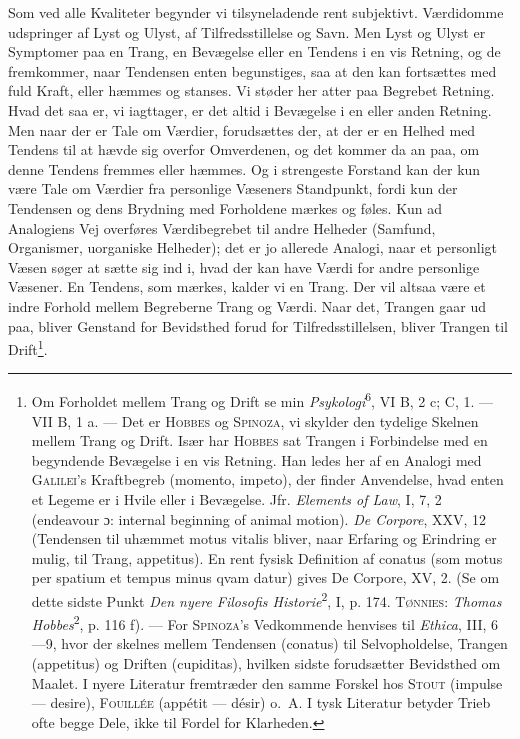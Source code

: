 \documentclass[12pt]{article}
\begin{document}
Som ved alle Kvaliteter begynder vi tilsyneladende rent subjektivt. Værdidomme
udspringer af Lyst og Ulyst, af Tilfredsstillelse og Savn. Men Lyst og Ulyst er
Symptomer paa en Trang, en Bevægelse eller en Tendens i en vis Retning, og de
fremkommer, naar Tendensen enten begunstiges, saa at den kan fortsættes med fuld
Kraft, eller hæmmes og stanses. Vi støder her atter paa Begrebet Retning. Hvad
det saa er, vi iagttager, er det altid i Bevægelse i en eller anden Retning. Men
naar der er Tale om Værdier, forudsættes der, at der er en Helhed med Tendens
til at hævde sig overfor Omverdenen, og det kommer da an paa, om denne Tendens
fremmes eller hæmmes. Og i strengeste Forstand kan der kun være Tale om Værdier
fra personlige Væseners Standpunkt, fordi kun der Tendensen og dens Brydning med
Forholdene mærkes og føles. Kun ad Analogiens Vej overføres Værdibegrebet til
andre Helheder (Samfund, Organismer, uorganiske Helheder); det er jo allerede
Analogi, naar et personligt Væsen søger at sætte sig ind i, hvad der kan have
Værdi for andre personlige Væsener. En Tendens, som mærkes, kalder vi en Trang.
Der vil altsaa være et indre Forhold mellem Begreberne Trang og Værdi. Naar det,
Trangen gaar ud paa, bliver Genstand for Bevidsthed forud for
Tilfredsstillelsen, bliver Trangen til Drift\footnote{Om Forholdet mellem Trang
og Drift se min \textit{Psykologi}\textsuperscript{6}, VI B, 2 c; C, 1. --- VII
B, 1 a. --- Det er \textsc{Hobbes} og \textsc{Spinoza}, vi skylder den tydelige
Skelnen mellem Trang og Drift. Især har \textsc{Hobbes} sat Trangen i
Forbindelse med en begyndende Bevægelse i en vis Retning. Han ledes her af en
Analogi med \textsc{Galilei}'s Kraftbegreb (momento, impeto), der finder
Anvendelse, hvad enten et Legeme er i Hvile eller i Bevægelse. Jfr.
\textit{Elements of Law}, I, 7, 2 (endeavour ɔ: internal beginning of animal
motion). \textit{De Corpore}, XXV, 12 (Tendensen til uhæmmet motus vitalis
bliver, naar Erfaring og Erindring er mulig,
til Trang, appetitus). En rent fysisk Definition af conatus (som motus per
spatium et tempus minus qvam datur) gives De Corpore, XV, 2. (Se om dette sidste
Punkt \textit{Den nyere Filosofis Historie}\textsuperscript{2}, I, p. 174.
\textsc{Tønnies}: \textit{Thomas Hobbes}\textsuperscript{2}, p. 116 f). --- For
\textsc{Spinoza}'s Vedkommende henvises til \textit{Ethica}, III, 6---9, hvor
der skelnes mellem Tendensen (conatus) til Selvopholdelse, Trangen (appetitus)
og Driften (cupiditas), hvilken sidste forudsætter Bevidsthed om Maalet. I nyere
Literatur fremtræder den samme Forskel hos \textsc{Stout} (impulse --- desire),
\textsc{Fouillée} (appétit --- désir) o.~A. I tysk Literatur betyder Trieb ofte
begge Dele, ikke til Fordel for Klarheden.}.
\end{document}
